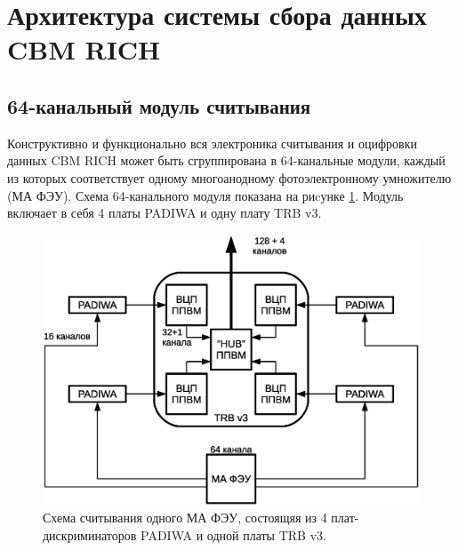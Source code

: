 \section{Архитектура системы сбора данных CBM RICH}\label{section:secModule}

\subsection{64-канальный модуль считывания}

Конструктивно и функционально вся электроника считывания и оцифровки данных CBM RICH может быть сгруппирована в 64-канальные модули, каждый из которых соответствует одному многоанодному фотоэлектронному умножителю (МА ФЭУ). Схема 64-канального модуля показана на риcунке \ref{fig:ReadoutModule}. Модуль включает в себя 4 платы PADIWA и одну плату TRB v3.

\begin{figure}
\includegraphics[width=1.0\textwidth]{pictures/4_A_PMT_readout_rus.eps}
\caption{Схема считывания одного МА ФЭУ, состоящяя из 4 плат-дискриминаторов PADIWA и одной платы TRB v3.}
\label{fig:ReadoutModule}
\end{figure}

